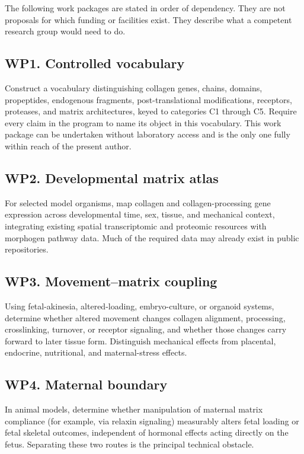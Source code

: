\documentclass[11pt,a4paper]{article}
\theoremstyle{plain}
\theoremstyle{definition}
\theoremstyle{remark}
\begin{document}
The following work packages are stated in order of dependency. They are not proposals for which funding or facilities exist. They describe what a competent research group would need to do.

\subsection{WP1. Controlled vocabulary}

Construct a vocabulary distinguishing collagen genes, chains, domains, propeptides, endogenous fragments, post-translational modifications, receptors, proteases, and matrix architectures, keyed to categories C1 through C5. Require every claim in the program to name its object in this vocabulary. This work package can be undertaken without laboratory access and is the only one fully within reach of the present author.

\subsection{WP2. Developmental matrix atlas}

For selected model organisms, map collagen and collagen-processing gene expression across developmental time, sex, tissue, and mechanical context, integrating existing spatial transcriptomic and proteomic resources with morphogen pathway data. Much of the required data may already exist in public repositories.

\subsection{WP3. Movement--matrix coupling}

Using fetal-akinesia, altered-loading, embryo-culture, or organoid systems, determine whether altered movement changes collagen alignment, processing, crosslinking, turnover, or receptor signaling, and whether those changes carry forward to later tissue form. Distinguish mechanical effects from placental, endocrine, nutritional, and maternal-stress effects.

\subsection{WP4. Maternal boundary}

In animal models, determine whether manipulation of maternal matrix compliance (for example, via relaxin signaling) measurably alters fetal loading or fetal skeletal outcomes, independent of hormonal effects acting directly on the fetus. Separating these two routes is the principal technical obstacle.
\end{document}

